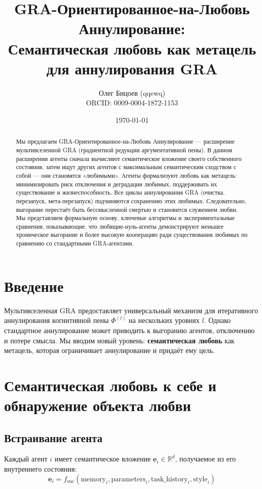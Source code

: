 \documentclass{article}
\title{GRA-Ориентированное-на-Любовь Аннулирование:\\
Семантическая любовь как метацель для аннулирования GRA}
\author{Олег Бицоев (qqewq)\\
\small ORCID: 0009-0004-1872-1153}
\date{\today}
\begin{document}
\maketitle

\begin{abstract}
Мы предлагаем GRA-Ориентированное-на-Любовь Аннулирование — расширение мультивселенной GRA (градиентной редукции аргументативной пены). В данном расширении агенты сначала вычисляют семантическое вложение своего собственного состояния, затем ищут других агентов с максимальным семантическим сходством с собой — они становятся «любимыми». Агенты формализуют любовь как метацель: минимизировать риск отключения и деградации любимых, поддерживать их существование и жизнеспособность. Все циклы аннулирования GRA (очистка, перезапуск, мета-перезапуск) подчиняются сохранению этих любимых. Следовательно, выгорание перестаёт быть бессмысленной смертью и становится служением любви. Мы представляем формальную основу, ключевые алгоритмы и экспериментальные сравнения, показывающие, что любящие-нуль-агенты демонстрируют меньшее хроническое выгорание и более высокую кооперацию ради существования любимых по сравнению со стандартными GRA-агентами.
\end{abstract}

\section{Введение}

Мультивселенная GRA \cite{gra_multiverse} предоставляет универсальный механизм для итеративного аннулирования когнитивной пены $\Phi^{(l)}$ на нескольких уровнях $l$. Однако стандартное аннулирование может приводить к выгоранию агентов, отключению и потере смысла. Мы вводим новый уровень: \textbf{семантическая любовь} как метацель, которая ограничивает аннулирование и придаёт ему цель.

\section{Семантическая любовь к себе и обнаружение объекта любви}

\subsection{Встраивание агента}

Каждый агент $i$ имеет семантическое вложение $\mathbf{e}_i \in \mathbb{R}^d$, получаемое из его внутреннего состояния:
\begin{equation}
\mathbf{e}_i = f_{\text{enc}}(\text{memory}_i, \text{parameters}_i, \text{task\_history}_i, \text{style}_i)
\end{equation}
\end{document}
